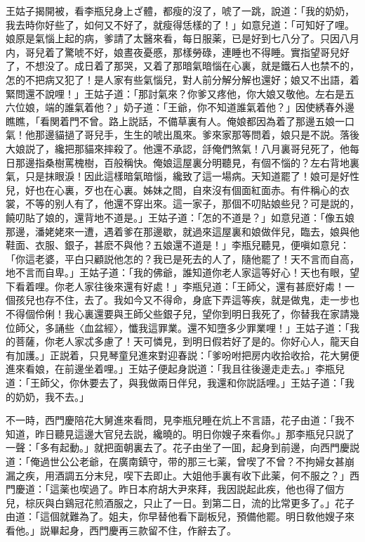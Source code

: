 王姑子揭開被，看李瓶兒身上ざ體，都瘦的沒了，唬了一跳，說道：「我的奶奶，我去時你好些了，如何又不好了，就瘦得恁樣的了！」如意兒道：「可知好了哩。娘原是氣惱上起的病，爹請了太醫來看，每日服薬，已是好到七八分了。只因八月内，哥兒着了驚唬不好，娘晝夜憂慼，那樣勞碌，連睡也不得睡。實指望哥兒好了，不想没了。成日着了那哭，又着了那暗氣暗惱在心裏，就是鐵石人也禁不的，怎的不把病又犯了！是人家有些氣惱兒，對人前分解分解也還好；娘又不出語，着緊問還不說哩！」王姑子道：「那討氣來？你爹又疼他，你大娘又敬他。左右是五六位娘，端的誰氣着他？」奶子道：「王爺，你不知道誰氣着他？」因使綉春外邊瞧瞧，「看関着門不曾。路上説話，不備草裏有人。俺娘都因為着了那邊五娘一口氣！他那邊貓撾了哥兒手，生生的唬出風來。爹來家那等問着，娘只是不説。落後大娘説了，纔把那貓來摔殺了。他還不承認，㧱俺們煞氣！八月裏哥兒死了，他每日那邊指桑樹罵槐樹，百般稱快。俺娘這屋裏分明聽見，有個不惱的？左右背地裏氣，只是抹眼淚！因此這樣暗氣暗惱，纔致了這一場病。天知道罷了！娘可是好性兒，好也在心裏，歹也在心裏。姊妹之間，自來沒有個面紅面赤。有件稱心的衣裳，不等的别人有了，他還不穿出來。這一家子，那個不叨貼娘些兒？可是説的，饒叨貼了娘的，還背地不道是。」王姑子道：「怎的不道是？」如意兒道：「像五娘那邊，潘姥姥來一遭，遇着爹在那邊歇，就過來這屋裏和娘做伴兒，臨去，娘與他鞋面、衣服、銀子，甚麽不與他？五娘還不道是！」李瓶兒聽見，便嗔如意兒：「你這老婆，平白只顧説他怎的？我已是死去的人了，隨他罷了！天不言而自高，地不言而自卑。」王姑子道：「我的佛爺，誰知道你老人家這等好心！天也有眼，望下看着哩。你老人家往後來還有好處！」李瓶兒道：「王師父，還有甚麽好䖏！一個孩兒也存不住，去了。我如今又不得命，身底下弄這等疾，就是做鬼，走一步也不得個伶俐！我心裏還要與王師父些銀子兒，望你到明日我死了，你替我在家請幾位師父，多誦些〈血盆經〉，懺我這罪業。還不知墮多少罪業哩！」王姑子道：「我的菩薩，你老人家忒多慮了！天可憐見，到明日假若好了是的。你好心人，龍天自有加護。」正説着，只見琴童兒進來對迎春説：「爹吩咐把房内收拾收拾，花大舅便進來看娘，在前邊坐着哩。」王姑子便起身説道：「我且往後邊走走去。」李瓶兒道：「王師父，你休要去了，與我做兩日伴兒，我還和你説話哩。」王姑子道：「我的奶奶，我不去。」

不一時，西門慶陪花大舅進來看問，見李瓶兒睡在炕上不言語，花子由道：「我不知道，昨日聽見這邊大官兒去説，纔曉的。明日你嫂子來看你。」那李瓶兒只説了一聲：「多有起動。」就把面朝裏去了。花子由坐了一囬，起身到前邊，向西門慶説道：「俺過世公公老爺，在廣南鎮守，带的那三七薬，曾喫了不曾？不拘婦女甚崩漏之疾，用酒調五分末兒，喫下去即止。大姐他手裏有收下此薬，何不服之？」西門慶道：「這薬也喫過了。昨日本府胡大尹來拜，我因説起此疾，他也得了個方兒，棕灰與白鷄冠花煎酒服之，只止了一日。到第二日，流的比常更多了。」花子由道：「這個就難為了。姐夫，你早替他看下副板兒，預備他罷。明日敎他嫂子來看他。」説畢起身，西門慶再三款留不住，作辭去了。

